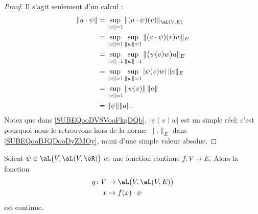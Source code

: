 \begin{proof}
	Il s'agit seulement d'un calcul :
	\begin{subequations}
		\begin{align}
			\| a\cdot \psi \| & =\sup_{\| v \|=1}\| (a\cdot \psi)(v) \|_{\aL(V,E)}                                          \\
			                  & =\sup_{\| v \|=1}\sup_{\| w \|=1}\| (a\cdot\psi)(v)w \|_E                                   \\
			                  & =\sup_{\| v \|=1}\sup_{\| w \|=1}\| \big( \psi(v)w \big)a \|_E  \label{SUBEQooDVSVooFkgDQb} \\
			                  & =\sup_{\| v \|=1}\sup_{\| w \|=1}| \psi(v)w |\,\| a \|_{E} \label{SUBEQooBJQDooDyZMOy}      \\
			                  & =\sup_{\| v \|=1}\| \psi(v) \|\,\| a \|                                                     \\
			                  & =\| \psi \|\| a \|.
		\end{align}
	\end{subequations}
	Notez que dans \eqref{SUBEQooDVSVooFkgDQb}, \( | \psi(v)w |\) est un simple réel; c'est pourquoi nous le retrouvons hors de la norme \( \| . \|_E\) dans \eqref{SUBEQooBJQDooDyZMOy}, muni d'une simple valeur absolue.
\end{proof}

\begin{lemma}
	Soient \( \psi\in\aL\big( V,\aL(V,\eR) \big)\) et une fonction continue \( f\colon V\to E\). Alors la fonction
	\begin{equation}
		\begin{aligned}
			g\colon V & \to \aL\big( V,\aL(V,E) \big) \\
			x         & \mapsto f(x)\cdot \psi
		\end{aligned}
	\end{equation}
	est continue.
\end{lemma}

